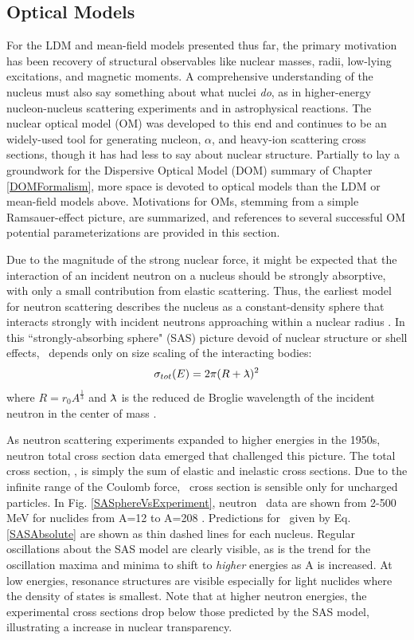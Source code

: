 \subsection{Optical Models}
For the LDM and mean-field models presented thus far, the primary motivation has been recovery
of structural observables like nuclear masses, radii, low-lying excitations, and magnetic moments. 
A comprehensive understanding of the nucleus must also say something about what
nuclei \textit{do}, as in higher-energy nucleon-nucleus scattering experiments
and in astrophysical reactions.
The nuclear optical model (OM) was developed to this end and continues to be an
widely-used tool for generating nucleon, $\alpha$, and heavy-ion scattering
cross sections, though it has had less to say about nuclear structure. Partially to lay a groundwork
for the Dispersive Optical Model (DOM) summary of Chapter \ref{DOMFormalism}, more space is devoted
to optical models than the LDM or mean-field models above. Motivations for OMs, stemming from a
simple Ramsauer-effect picture, are
summarized, and references to several successful OM potential parameterizations
are provided in this section.

Due to the magnitude of the strong nuclear force, it might be expected that 
the interaction of an incident neutron on a nucleus should be strongly
absorptive, with only a small contribution from elastic scattering. Thus, the
earliest model for neutron scattering describes the nucleus as a constant-density
sphere that interacts strongly with incident neutrons approaching within a nuclear radius
\cite{Feshbach1949}. In this ``strongly-absorbing sphere" (SAS) picture devoid of nuclear structure
or shell effects, \tot\ depends only on size scaling of the interacting bodies:
\begin{equation} \label{SASAbsolute}
    \sigma_{tot}(E) = 2\pi(R + \lambdabar)^{2}
\end{equation}
where $R=r_{0}A^{\frac{1}{3}}$ and $\lambdabar$ is the reduced de Broglie wavelength
of the incident neutron in the center of mass \cite{Fernbach1949, Satchler1980}. 

As neutron scattering experiments expanded to higher energies in the 1950s, 
neutron total cross section data emerged that challenged this picture. The total
cross section, \tot, is simply the sum of elastic and inelastic cross sections.
Due to the infinite range of the Coulomb force, \tot\ cross section is sensible only for
uncharged particles. In Fig.
\ref{SASphereVsExperiment}, neutron \tot\ data are shown from 2-500
MeV for nuclides from A=12 to A=208 \cite{Finlay1993, Schwartz1974, Poenitz1983, Abfalterer2000, 
Abfalterer2001}. Predictions for \tot\ given by Eq. \ref{SASAbsolute} are shown as thin dashed 
lines for each nucleus. Regular oscillations about the SAS model are clearly
visible, as is the trend for the oscillation maxima and minima to shift to \textit{higher}
energies as 
A is increased. At low energies, resonance structures are visible especially for light nuclides 
where the density of states is smallest. Note that at higher neutron energies, the experimental
cross sections drop below those predicted by the SAS model, illustrating
a increase in nuclear transparency.

